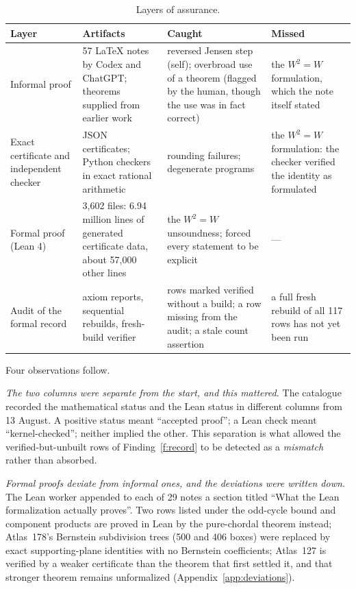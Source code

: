 \documentclass[11pt,a4paper]{article}
\begin{document}
\begin{table}[t]
\centering\small
\caption{Layers of assurance.}
\label{tab:layers}
\begin{tabularx}{\linewidth}{@{}P{2.5cm}P{3.4cm}YY@{}}
\toprule
Layer & Artifacts & Caught & Missed\\ \midrule
Informal proof & 57 LaTeX notes by Codex and ChatGPT; theorems supplied from earlier work & reversed Jensen step (self); overbroad use of a theorem (flagged by the human, though the use was in fact correct) & the $W^2=W$ formulation, which the note itself stated\\
Exact certificate and independent checker & JSON certificates; Python checkers in exact rational arithmetic & rounding failures; degenerate programs & the $W^2=W$ formulation: the checker verified the identity as formulated\\
Formal proof (Lean 4) & 3,602 files: 6.94 million lines of generated certificate data, about 57,000 other lines & the $W^2=W$ unsoundness; forced every statement to be explicit & ---\\
Audit of the formal record & axiom reports, sequential rebuilds, fresh-build verifier & rows marked verified without a build; a row missing from the audit; a stale count assertion & a full fresh rebuild of all 117 rows has not yet been run\\
\bottomrule
\end{tabularx}
\end{table}

Four observations follow.

\emph{The two columns were separate from the start, and this mattered.} The catalogue recorded the mathematical
status and the Lean status in different columns from 13 August. A positive status meant ``accepted proof''; a
Lean check meant ``kernel-checked''; neither implied the other. This separation is what allowed the
verified-but-unbuilt rows of Finding~\ref{f:record} to be detected as a \emph{mismatch} rather than absorbed.

\emph{Formal proofs deviate from informal ones, and the deviations were written down.} The Lean worker appended
to each of 29 notes a section titled ``What the Lean formalization actually proves''. Two rows listed under the
odd-cycle bound and component products are proved in Lean by the pure-chordal theorem instead; Atlas~178's
Bernstein subdivision trees (500 and 406 boxes) were replaced by exact supporting-plane identities with no
Bernstein coefficients; Atlas~127 is verified by a weaker certificate than the theorem that first settled it,
and that stronger theorem remains unformalized (Appendix~\ref{app:deviations}).
\end{document}
